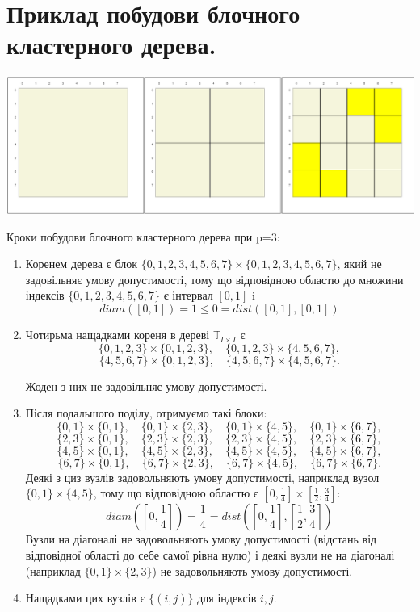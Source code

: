 \documentclass[12pt]{report}
\begin{document}
	\section{Приклад побудови блочного кластерного дерева.}
	\includegraphics[scale=0.45]{1_3}
	\par Кроки побудови блочного кластерного дерева при p=3:
	\begin{enumerate}
	\item Коренем дерева є блок $\{0,1,2,3,4,5,6,7\}\times\{0,1,2,3,4,5,6,7\}$, який не задовільняє умову допустимості, тому що відповідною областю до множини індексів $\{0,1,2,3,4,5,6,7\}$ є інтервал $[0,1]$ i $$diam([0,1])=1\le 0=dist([0,1],[0,1])$$
	\item Чотирьма нащадками кореня в дереві $\mathbb{T}_{I\times I}$ є
	$$\{0,1,2,3\}\times\{0,1,2,3\},\quad\{0,1,2,3\}\times\{4,5,6,7\},$$
	$$\{4,5,6,7\}\times\{0,1,2,3\},\quad\{4,5,6,7\}\times\{4,5,6,7\}.$$
	\par Жоден з них не задовільняє умову допустимості.
	\item Після подальшого поділу, отримуємо такі блоки:
	$$\{0,1\}\times\{0,1\},\quad\{0,1\}\times\{2,3\},\quad\{0,1\}\times\{4,5\},\quad\{0,1\}\times\{6,7\},$$
	$$\{2,3\}\times\{0,1\},\quad\{2,3\}\times\{2,3\},\quad\{2,3\}\times\{4,5\},\quad\{2,3\}\times\{6,7\},$$
	$$\{4,5\}\times\{0,1\},\quad\{4,5\}\times\{2,3\},\quad\{4,5\}\times\{4,5\},\quad\{4,5\}\times\{6,7\},$$
	$$\{6,7\}\times\{0,1\},\quad\{6,7\}\times\{2,3\},\quad\{6,7\}\times\{4,5\},\quad\{6,7\}\times\{6,7\}.$$
	Деякі з циз вузлів задовольняють умову допустимості, наприклад вузол $\{0,1\}\times\{4,5\}$, тому що відповідною областю є $[0,\frac{1}{4}]\times [\frac{1}{2},\frac{3}{4}]$:
	$$diam([0,\frac{1}{4}])=\frac{1}{4}=dist([0,\frac{1}{4}],[\frac{1}{2},\frac{3}{4}])$$
	Вузли на діагоналі не задовольняють умову допустимості (відстань від відповідної області до себе самої рівна нулю) і деякі вузли не на діагоналі (наприклад $\{0,1\}\times \{2,3\}$) не задовольняють умову допустимості.
	\item Нащадками цих вузлів є $\{(i,j)\}$ для індексів $i,j$. 

\end{enumerate}
\end{document}
